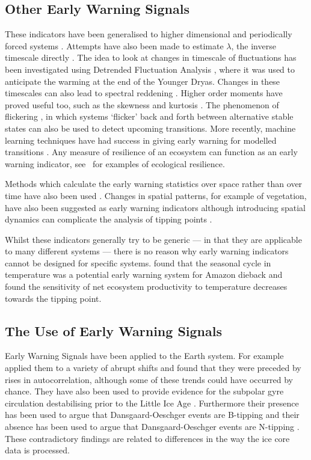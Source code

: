 \subsection{Other Early Warning Signals}
These indicators have been generalised to higher dimensional and periodically forced systems \parencite{Williamson2015,Williamson2016}. Attempts have also been made to estimate
$\lambda$, the inverse timescale directly \parencite{Boettner2022,Boers2021a}. The idea to look at
changes in timescale of fluctuations has been investigated using Detrended Fluctuation Analysis \parencite{Livina2007}, where it was used to anticipate the warming at the
end of the Younger Dryas. Changes in these timescales can also lead to spectral reddening \parencite{Kleinen2003}. Higher order moments have proved useful too, such as the
skewness \parencite{Guttal2008} and kurtosis \parencite{Xie2019}. The phenomenon of flickering \parencite{Wang2012}, in which systems `flicker' back and forth between alternative stable
states can also be used to detect upcoming transitions. More recently, machine learning techniques have had success in giving early warning for modelled transitions \parencite{Bury2021}.
Any measure of resilience of an ecosystem can function as an early warning indicator, see~\cite{Krakovska2023} for examples of ecological resilience.


Methods which calculate the early warning statistics over space rather than over time have also been used \parencite{Donangelo2010,Guttal2009}. Changes in spatial
patterns, for example of vegetation, have also been suggested as early warning indicators \parencite{Kefi2007,Kefi2014} although introducing spatial dynamics can complicate the analysis
of tipping points \parencite{Rietkerk2021}.

Whilst these indicators generally try to be generic --- in that they are applicable to many different systems --- there is no reason why early warning indicators cannot be designed for specific systems.
\cite{Parry2022} found that the seasonal cycle in temperature was a potential early warning system for Amazon dieback and~\cite{Boulton2013} found the sensitivity of net ecosystem productivity to temperature decreases
towards the tipping point.

\subsection{The Use of Early Warning Signals}
Early Warning Signals have been applied to the Earth system. For example~\cite{Dakos2008} applied them to a variety of abrupt shifts and found that they were preceded by rises in autocorrelation,
although some of these trends could have occurred by chance. They have also been used to provide evidence for the subpolar gyre circulation destabilising prior to the
Little Ice Age \parencite{Arellano-Nava2022}. Furthermore their presence has been
used to argue that Dansgaard-Oeschger events are B-tipping \parencite{Boers2018a} and their absence has been used to argue that Dansgaard-Oeschger events are N-tipping \parencite{Ditlevsen2010}.
These contradictory findings
are related to differences in the way the ice core data is processed.


